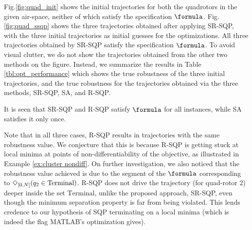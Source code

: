 Fig.\ref{fig:quad_init} shows the initial trajectories for both the quadrotors in the given air-space, neither of which satisfy the specification $\formula$. 
Fig.\ref{fig:quad_ssqp} shows the three trajectories obtained after applying SR-SQP,
with the three initial trajectories as initial guesses for the optimizations. 
All three trajectories obtained by SR-SQP satisfy the specification $\formula$. 
To avoid visual clutter, we do not show the trajectories obtained from the other two methods on the figure.
Instead, we summarize the results in Table \ref{tbl:opt_performance} which shows the true robustness of the three initial trajectories, and the true robustness for the trajectories obtained via the three methods, SR-SQP, SA, and R-SQP.

It is seen that SR-SQP and R-SQP satisfy $\formula$ for all instances, while SA satisfies it only once.

Note that in all three cases, R-SQP results in trajectories with the same robustness value. 
We conjecture that this is because R-SQP is getting stuck at local minima at points of non-differentiability of the objective, as illustrated in Example \ref{ex:cluster nondiff}.
On further investigation, we also noticed that the robustness value achieved is due to the segment of the $\formula$ corresponding to $\Diamond_{[0,N]}(q_2 \in \text{Terminal})$. R-SQP does not drive the trajectory (for quad-rotor 2) deeper inside the set $\text{Terminal}$, unlike the proposed approach, SR-SQP, even though the minimum separation property is far from being violated. This lends credence to our hypothesis of SQP terminating on a local minima (which is indeed the flag MATLAB's optimization gives).


